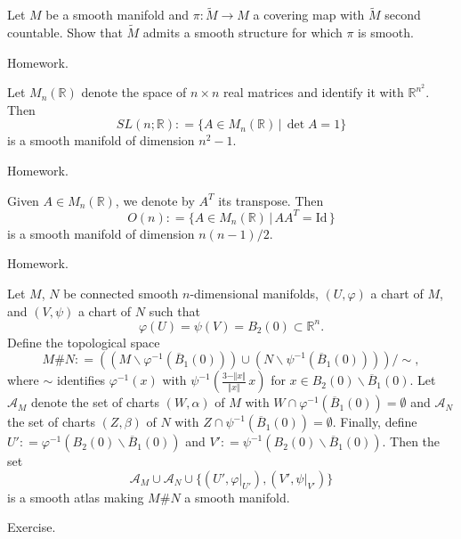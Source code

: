 \documentclass{ximera}
\begin{document}
\begin{example} Let $M$ be a smooth manifold and $\pi : \tilde{M} \to M$ a covering map with $\tilde{M}$ second countable. Show that $\tilde{M}$ admits a smooth structure for which $\pi$ is smooth. 

\begin{solution}
    Homework.
\end{solution}
\end{example}



\begin{example}   Let $M_n (\mathbb{R})$ denote the space of $n\times n$ real matrices and identify it with $\mathbb{R}^{n^2}$. Then 
    \[      SL  (n ; \mathbb{R}) : = \{ A \in M_n (\mathbb{R}) \,  \vert \, \det A   = 1 \}         \]
    is a smooth manifold of dimension $n^2-1$. 
\begin{solution}
    Homework.
\end{solution}
\end{example}

\begin{example}   Given $A \in M_n(\mathbb{R})$, we denote by $A^T $ its transpose. Then 
    \[      O  (n ) : = \{ A \in M_n (\mathbb{R}) \, \vert \, A A^{T}  = \text{Id} \, \}         \]
    is a smooth manifold of dimension $n(n-1)/2$. 
\begin{solution}
    Homework.
\end{solution}
\end{example}



\begin{example}   Let $M$, $N$ be connected smooth  $n$-dimensional manifolds, $(U, \varphi )$ a chart of $M$, and $(V, \psi)$ a chart of $N$ such that 
\[    \varphi (U) = \psi (V) = B_2 (0) \subset \mathbb{R}^n .  \]
Define the topological space 
\[      M \# N : = ( (M \backslash \varphi ^{-1} ( \overline{B}_1 (0)  ) ) \cup (N \backslash  \psi ^{-1} (\overline{B}_1(0) ) )    ) / \sim ,                              \]
where $\sim$ identifies $\varphi ^{-1} (x)$ with $\psi ^{-1} \left( \frac{3 - \Vert x \Vert }{\Vert x \Vert } \, x  \right)$ for $x \in B_2 (0) \backslash \overline{B}_1(0)$. Let $\mathcal{A}_M$ denote the set of charts $(W, \alpha)$ of $M$ with $W \cap \varphi ^{-1} (\overline{B}_1(0)) = \emptyset$ and $\mathcal{A}_N$ the set of charts $(Z, \beta)$ of $N$ with $Z \cap \psi ^{-1} (\overline{ B}_1(0)) = \emptyset $. Finally, define $U ' : = \varphi ^{-1} (B_2 (0) \backslash \overline{B}_1(0))$ and $V ' : = \psi ^{-1} (B_2(0) \backslash \overline{B}_1(0))$. Then the set
\[       \mathcal{A}_M \cup \mathcal{A}_N \cup \{ (U', \varphi\vert _{U'} ) , (V', \psi \vert_{V'})   \}   \]
is a smooth atlas making $M \# N $ a smooth manifold. 

\begin{solution}
    Exercise.
\end{solution}
\end{example} 
\end{document}
